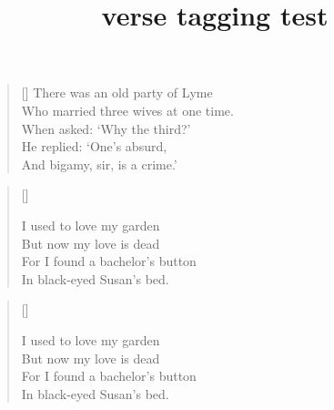 \documentclass{article}
\title{verse tagging test}
\newcommand{\garden}{
I used to love my garden \\
But now my love is dead \\
For I found a bachelor's button \\
In black-eyed Susan's bed.
}
\begin{document}
\tableofcontents

\renewcommand{\poemtoc}{subsection}
\settowidth{\versewidth}{There was an old party of Lyme}
\begin{verse}[\versewidth]
There was an old party of Lyme \\
Who married three wives at one time. \\
\vin When asked: `Why the third?' \\
\vin He replied: `One's absurd, \\
And bigamy, sir, is a crime.' \\
\end{verse}

\settowidth{\versewidth}{But now my love is dead}
\begin{verse}[\versewidth]
\begin{altverse}
\garden
\end{altverse}
\end{verse}

\begin{verse}[\versewidth]
\begin{altverse}
\garden
\end{altverse}
\end{verse}
\end{document}
